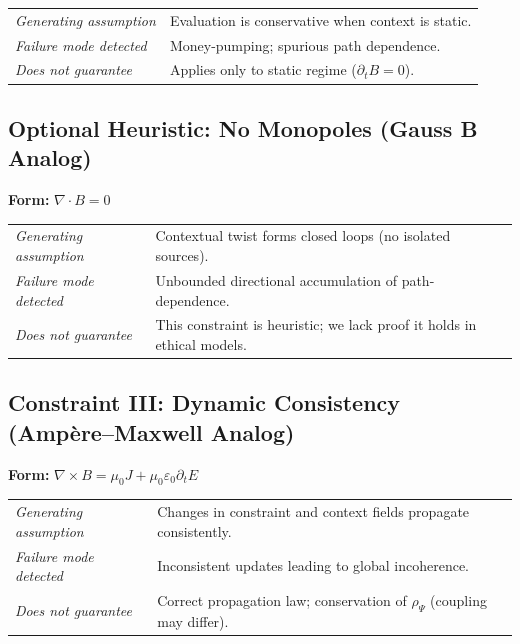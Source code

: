 \documentclass[12pt]{article}
\begin{document}
\begin{table}[h]
\centering
\begin{tabular}{ll}
\emph{Generating assumption} & Evaluation is conservative when context is static. \\
\emph{Failure mode detected} & Money-pumping; spurious path dependence. \\
\emph{Does not guarantee} & Applies only to static regime ($\partial_t B = 0$). \\
\end{tabular}
\end{table}

\subsection{Optional Heuristic: No Monopoles (Gauss B Analog)}

\textbf{Form:} $\nabla \cdot B = 0$

\begin{table}[h]
\centering
\begin{tabular}{ll}
\emph{Generating assumption} & Contextual twist forms closed loops (no isolated sources). \\
\emph{Failure mode detected} & Unbounded directional accumulation of path-dependence. \\
\emph{Does not guarantee} & This constraint is heuristic; we lack proof it holds in ethical models. \\
\end{tabular}
\end{table}

\subsection{Constraint III: Dynamic Consistency (Amp\`{e}re--Maxwell Analog)}

\textbf{Form:} $\nabla \times B = \mu_0 J + \mu_0 \varepsilon_0 \partial_t E$

\begin{table}[h]
\centering
\begin{tabular}{ll}
\emph{Generating assumption} & Changes in constraint and context fields propagate consistently. \\
\emph{Failure mode detected} & Inconsistent updates leading to global incoherence. \\
\emph{Does not guarantee} & Correct propagation law; conservation of $\rho_\Psi$ (coupling may differ). \\
\end{tabular}
\end{table}
\end{document}
